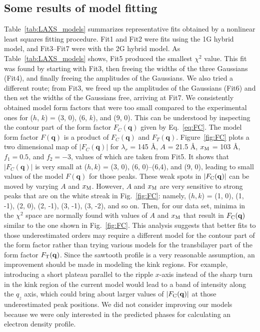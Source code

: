\subsection{Some results of model fitting}\label{sec:LAXS_model_results}
Table~\ref{tab:LAXS_models} summarizes representative fits obtained by a nonlinear
least squares fitting procedure. Fit1 and Fit2 were fits using the 1G hybrid model,
and Fit3--Fit7 were with the 2G hybrid model. As Table~\ref{tab:LAXS_models} shows, 
Fit5 produced the smallest $\chi^2$ value. This fit was found by 
starting with
Fit3, then freeing the widths of the three Gaussians (Fit4), 
and finally freeing the amplitudes of the Gaussians.
We also tried a different route; from Fit3, we freed up the amplitudes of 
the Gaussians (Fit6) and then set the widths of the Gaussians free, arriving  
at Fit7. 
We consistently obtained model
form factors that were too small compared to the experimental ones 
for ($h$, $k$) = (3, 0), (6, $k$), and (9, 0). This can be understood by
inspecting the contour part of the form factor $F_C(\mathbf{q})$ 
given by Eq.~\ref{eq:FC}.
The model form factor $F(\mathbf{q})$ is a product of
$F_C(\mathbf{q})$ and $F_T(\mathbf{q})$.
Figure~\ref{fig:FC} plots a two dimensional map of $|F_C(\mathbf{q})|$ for
$\lambda_r$ = 145 \AA, $A$ = 21.5 \AA, $x_\textrm{M}$ = 103 \AA, $f_1=0.5$,
and $f_2=-3$, values of which are taken from Fit5.
It shows that $|F_C(\mathbf{q})|$ is very small at 
($h, k$) = (3, 0), (6, 0)--(6,4), and (9, 0), leading to small values of
the model $F(\mathbf{q})$ for those peaks. These weak spots in $|F_\mathrm{C}(\mathbf{q})|$
can be moved by varying $A$ and $x_\textrm{M}$. However, $A$ and $x_\textrm{M}$ are very 
sensitive to strong peaks that are on the white streak in Fig.~\ref{fig:FC}:
namely, ($h, k$) = (1, 0), (1, -1), (2, 0), (2, -1), (3, -1), (3, -2), and so on.
Then, for our data set, minima in the $\chi^2$ space are normally found
with values of $A$ and $x_\textrm{M}$ that result in $F_\mathrm{C}(\mathbf{q})$ similar to the 
one shown in Fig.~\ref{fig:FC}.
This analysis 
suggests that better fits to those underestimated orders may require a different model
for the contour part of the form factor rather than trying various
models for the transbilayer part of the form factor $F_\mathrm{T}(\mathbf{q})$. 
Since the sawtooth profile is a very reasonable assumption, an improvement
should be made in modeling the kink regions.
For example, introducing a short plateau parallel to the ripple $x$-axis
instead of the sharp turn in the kink region of the current model would
lead to a band of intensity along the $q_z$ axis, which could bring about 
larger values of $|F_\mathrm{C}(\mathbf{q})|$ at those underestimated peak positions.
We did not consider improving our models because we were only interested in the predicted
phases for calculating an electron density profile.

